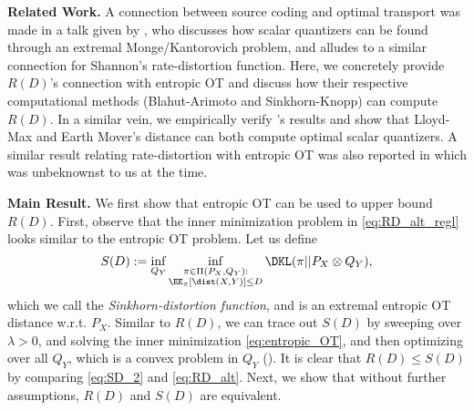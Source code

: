 \documentclass{article} %
\begin{document}
    \textbf{Related Work.} A connection between source coding and optimal transport was made in a talk given by \cite{GrayOT}, who discusses how scalar quantizers can be found through an extremal Monge/Kantorovich problem, and alludes to a similar connection for Shannon's rate-distortion function. Here, we concretely provide $R(D)$'s connection with entropic OT and discuss how their respective computational methods (Blahut-Arimoto and Sinkhorn-Knopp) can compute $R(D)$. In a similar vein, we empirically verify \cite{GrayOT}'s results and show that Lloyd-Max and Earth Mover's distance can both compute optimal scalar quantizers. A similar result relating rate-distortion with entropic OT was also reported in \cite{wu2022communication} which was unbeknownst to us at the time.

    \textbf{Main Result.}
    We first show that entropic OT can be used to upper bound $R(D)$. First, observe that the inner minimization problem in \eqref{eq:RD_alt_regl} looks similar to the entropic OT problem. Let us define 
    \begin{equation}
        S(D) := \inf_{Q_Y} \inf_{\substack{\pi \in \Pi(P_X, Q_Y): \\ \EE_{\pi}[\dist(X,Y)]  \leq D }} \DKL(\pi||P_X \otimes Q_Y), \label{eq:SD_2}
    \end{equation}
    which we call the \emph{Sinkhorn-distortion function}, and is an extremal entropic OT distance w.r.t. $P_X$. Similar to $R(D)$, we can trace out $S(D)$ by sweeping over $\lambda > 0$, and solving the inner minimization \eqref{eq:entropic_OT}, and then optimizing over all $Q_Y$, which is a convex problem in $Q_Y$ (\cite{feydy2019interpolating}). It is clear that $R(D) \leq S(D)$ by comparing \eqref{eq:SD_2} and \eqref{eq:RD_alt}. Next, we show that without further assumptions, $R(D)$ and $S(D)$ are equivalent.
\end{document}
